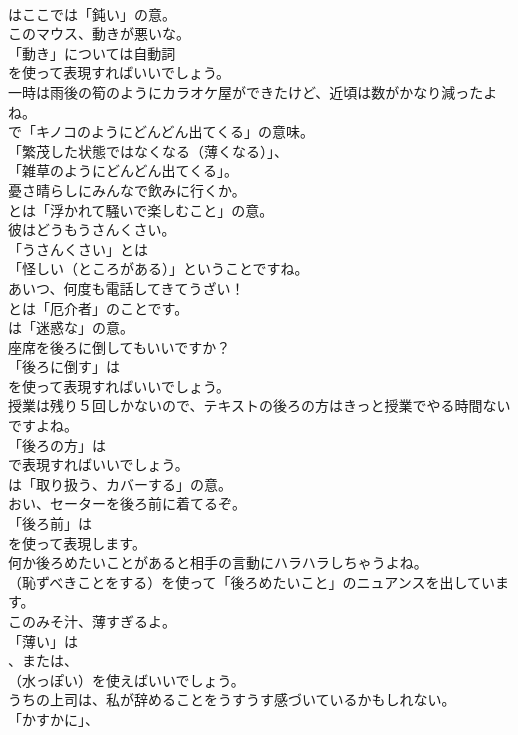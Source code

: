 \documentclass[8pt]{extreport}
\begin{document}
\begin{CJK}{UTF8}{min}
\\	はここでは「鈍い」の意。	
\\	このマウス、動きが悪いな。 
\\	「動き」については自動詞 
\\	を使って表現すればいいでしょう。	
\\	一時は雨後の筍のようにカラオケ屋ができたけど、近頃は数がかなり減ったよね。 
\\	で「キノコのようにどんどん出てくる」の意味。
\\	「繁茂した状態ではなくなる（薄くなる）」、
\\	「雑草のようにどんどん出てくる」。	
\\	憂さ晴らしにみんなで飲みに行くか。 
\\	とは「浮かれて騒いで楽しむこと」の意。	
\\	彼はどうもうさんくさい。 
\\	「うさんくさい」とは
\\	「怪しい（ところがある）」ということですね。	
\\	あいつ、何度も電話してきてうざい！ 
\\	とは「厄介者」のことです。
\\	は「迷惑な」の意。	
\\	座席を後ろに倒してもいいですか？ 
\\	「後ろに倒す」は
\\	を使って表現すればいいでしょう。	
\\	授業は残り５回しかないので、テキストの後ろの方はきっと授業でやる時間ないですよね。 
\\	「後ろの方」は
\\	で表現すればいいでしょう。
\\	は「取り扱う、カバーする」の意。	
\\	おい、セーターを後ろ前に着てるぞ。 
\\	「後ろ前」は
\\	を使って表現します。	
\\	何か後ろめたいことがあると相手の言動にハラハラしちゃうよね。 
\\	（恥ずべきことをする）を使って「後ろめたいこと」のニュアンスを出しています。	
\\	このみそ汁、薄すぎるよ。 
\\	「薄い」は
\\	、または、
\\	（水っぽい）を使えばいいでしょう。	
\\	うちの上司は、私が辞めることをうすうす感づいているかもしれない。 
\\	「かすかに」、

\end{CJK}
\end{document}
